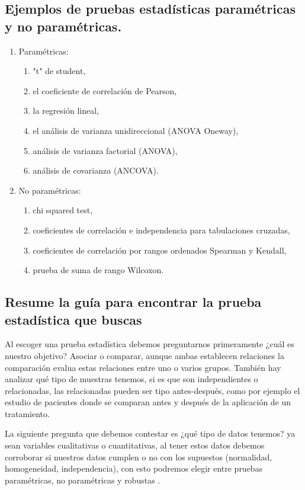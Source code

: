 \documentclass[]{article}
\begin{document}
\subsection{Ejemplos de pruebas estadísticas	paramétricas y no paramétricas.}
\begin{enumerate}    
\item Paramétricas:

  \begin{enumerate}
    \item "t" de student,
    \item el coeficiente de correlación de Pearson,
    \item la regresión lineal,
    \item el análisis de varianza unidireccional (ANOVA Oneway), 
    \item análisis de varianza factorial (ANOVA), 
    \item análisis de covarianza (ANCOVA).

  \end{enumerate}
  
\item No paramétricas:
  \begin{enumerate}
    \item chi squared test,
    \item coeficientes de correlación e independencia para tabulaciones cruzadas,
    \item coeficientes de correlación por rangos ordenados Spearman y Kendall,
    \item prueba de suma de rango Wilcoxon.
  \end{enumerate}
\end{enumerate}


\subsection{Resume la guía para encontrar la prueba estadística que buscas}
Al escoger una prueba estadística debemos preguntarnos primeramente ¿cuál es nuestro objetivo? Asociar o comparar, aunque ambas establecen relaciones la comparación evalua estas relaciones entre uno o varios grupos.
También hay analizar qué tipo de muestras tenemos, si es que son independientes o relacionadas, las relacionadas pueden ser tipo antes-después, como por ejemplo el estudio de pacientes donde se comparan antes y después de la aplicación de un tratamiento.

La siguiente pregunta que debemos contestar es ¿qué tipo de datos tenemos? ya sean variables cualitativas o cuantitativas, al tener estos datos debemos corroborar si nuestros datos cumplen o no con los supuestos (normalidad, homogeneidad, independencia), con esto podremos elegir entre pruebas paramétricas, no paramétricas y robustas \cite{Articulo_3}.
\end{document}
